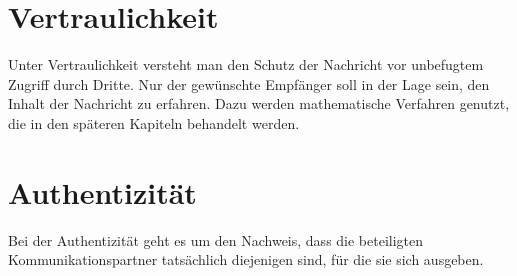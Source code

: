 \section{Vertraulichkeit}

Unter Vertraulichkeit versteht man den Schutz der Nachricht vor unbefugtem Zugriff durch Dritte. Nur der gewünschte Empfänger soll in der Lage sein, den Inhalt der Nachricht zu erfahren. Dazu werden mathematische Verfahren genutzt, die in den späteren Kapiteln behandelt werden.

\section{Authentizität}

Bei der Authentizität geht es um den Nachweis, dass die beteiligten Kommunikationspartner tatsächlich diejenigen sind, für die sie sich ausgeben.